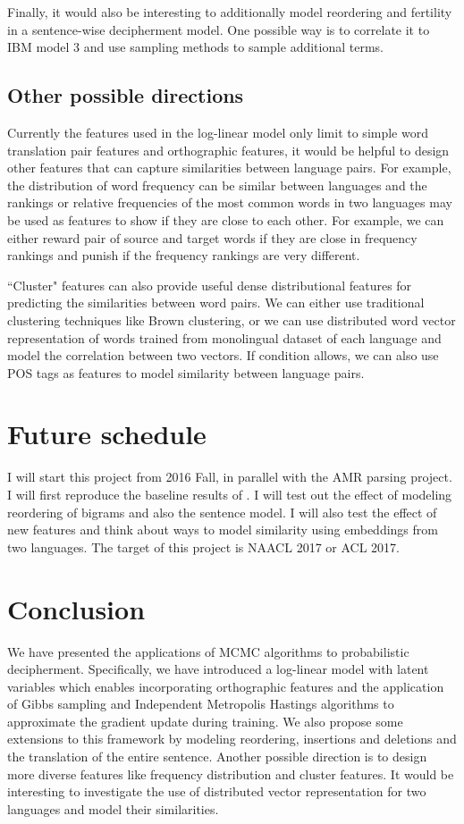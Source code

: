 Finally, it would also be interesting to additionally model reordering and fertility in a sentence-wise decipherment model. One possible way is
to correlate it to IBM model 3 and use sampling methods to sample additional terms.
\subsection{Other possible directions}
Currently the features used in the log-linear model only limit to simple word translation pair features and orthographic features, it
would be helpful to design other features that can capture similarities between language pairs.
For example, the distribution of word frequency can be similar between languages and the rankings or relative frequencies of the most common words
in two languages may be used as features to show if they are close to each other. For example, we can either reward pair of source and target words if they are close in frequency rankings and 
punish if the frequency rankings are very different.


``Cluster" features can also provide useful dense distributional features for predicting the similarities between word pairs. We can either use traditional clustering
techniques like Brown clustering, or we can use distributed word vector representation of words trained from monolingual dataset of each language and model the correlation between two vectors. If condition allows, we can also use POS tags as features to model similarity between language pairs.
\section{Future schedule}
I will start this project from 2016 Fall, in parallel with the AMR parsing project. I will first reproduce the baseline results of . I will test out the effect of 
modeling reordering of bigrams and also the sentence model. I will also test the effect of new features and think about ways to model similarity using embeddings from two languages.
The target of this project is NAACL 2017 or ACL 2017.
\section{Conclusion}
We have presented the applications of MCMC algorithms to probabilistic decipherment. Specifically, we have introduced a log-linear model with latent variables which
enables incorporating orthographic features and the application of Gibbs sampling and Independent Metropolis Hastings algorithms to approximate the gradient update during training.
We also propose some extensions to this framework by modeling reordering, insertions and deletions and the translation of the entire sentence.
Another possible direction is to design more diverse features like frequency distribution and cluster features. It would be interesting to investigate the use of 
distributed vector representation for two languages and model their similarities.

